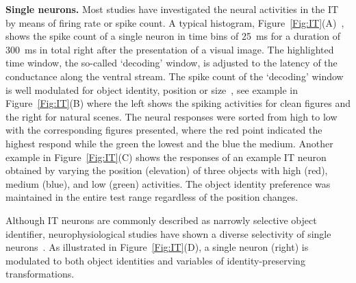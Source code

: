 \documentclass[journal]{journal}
\begin{document}
\textbf{Single neurons.}
Most studies have investigated the neural activities in the IT by means of firing rate or spike count.
A typical histogram, Figure~\ref{Fig:IT}(A)~\cite{zoccolan2007trade}, shows the spike count of a single neuron in time bins of 25~ms for a duration of 300~ms in total right after the presentation of a visual image.
The highlighted time window, the so-called `decoding' window, is adjusted to the latency of the conductance along the ventral stream. 
The spike count of the `decoding' window is well modulated for object identity, position or size~\cite{desimone1984stimulus}, see example in Figure~\ref{Fig:IT}(B) where the left shows the spiking activities for clean figures and the right for natural scenes.
The neural responses were sorted from high to low with the corresponding figures presented, where the red point indicated the highest respond while the green the lowest and the blue the medium.
Another example in Figure~\ref{Fig:IT}(C) shows the responses of an example IT neuron obtained by varying the position (elevation) of three objects with high (red), medium (blue), and low (green) activities.
The object identity preference was maintained in the entire test range regardless of the position changes.


Although IT neurons are commonly described as narrowly selective object identifier, neurophysiological studies have shown a diverse selectivity of single neurons~\cite{desimone1984stimulus}.
As illustrated in Figure~\ref{Fig:IT}(D), a single neuron (right) is modulated to both object identities and variables of identity-preserving transformations.
\end{document}
